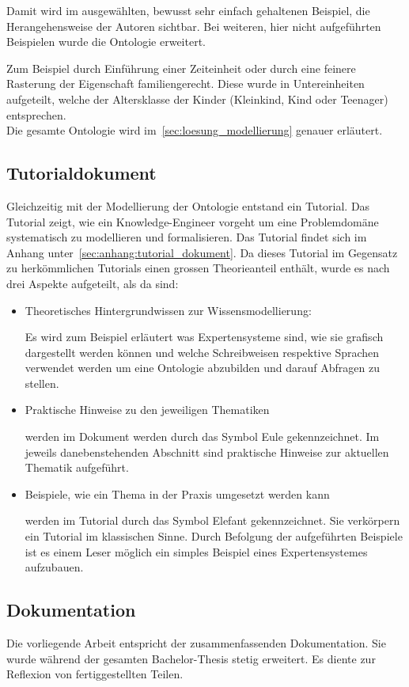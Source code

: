 Damit wird im ausgewählten, bewusst sehr einfach gehaltenen Beispiel, die Herangehensweise der Autoren sichtbar. Bei weiteren, hier nicht aufgeführten Beispielen wurde die Ontologie erweitert.

Zum Beispiel durch Einführung einer Zeiteinheit oder durch eine feinere Rasterung der Eigenschaft familiengerecht. Diese wurde in Untereinheiten aufgeteilt, welche der Altersklasse der Kinder (Kleinkind, Kind oder Teenager) entsprechen.\\
Die gesamte Ontologie wird im~\autoref{sec:loesung_modellierung} genauer erläutert.

\subsection{Tutorialdokument}
\label{subsec:dokumentation_wissensmodellierung}
Gleichzeitig mit der Modellierung der Ontologie entstand ein Tutorial. Das Tutorial zeigt, wie ein Knowledge-Engineer vorgeht um eine Problemdomäne systematisch zu modellieren und formalisieren. Das Tutorial findet sich im Anhang unter~\ref{sec:anhang:tutorial_dokument}. Da dieses  Tutorial im Gegensatz zu herkömmlichen Tutorials einen grossen Theorieanteil enthält, wurde es nach drei Aspekte aufgeteilt, als da sind:
\begin{itemize}
    \item Theoretisches Hintergrundwissen zur Wissensmodellierung:

        Es wird zum Beispiel erläutert was Expertensysteme sind, wie sie grafisch dargestellt werden können und welche Schreibweisen respektive Sprachen verwendet werden um eine Ontologie abzubilden und darauf Abfragen zu stellen.

    \item Praktische Hinweise zu den jeweiligen Thematiken

        werden im Dokument werden durch das Symbol Eule gekennzeichnet. Im jeweils danebenstehenden Abschnitt sind praktische Hinweise zur aktuellen Thematik aufgeführt.

    \item Beispiele, wie ein Thema in der Praxis umgesetzt werden kann

        werden im Tutorial durch das Symbol Elefant gekennzeichnet. Sie verkörpern ein Tutorial im klassischen Sinne. Durch Befolgung der aufgeführten Beispiele ist es einem Leser möglich ein simples Beispiel eines Expertensystemes aufzubauen.
\end{itemize}

\subsection{Dokumentation}
\label{subsec:abschliessende_dokumentation}
Die vorliegende Arbeit entspricht der zusammenfassenden Dokumentation. Sie wurde während der gesamten Bachelor-Thesis stetig erweitert. Es diente zur Reflexion von fertiggestellten Teilen.
